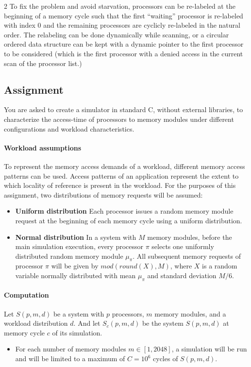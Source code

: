 \documentclass[12pt]{article}
\begin{document}
\begin{multicols}{2}
To fix the problem and avoid starvation, processors can be re-labeled at the beginning of a memory cycle such that the first ``waiting'' processor is re-labeled with index 0 and the remaining processors are cyclicly re-labeled in the natural order. The relabeling can be done dynamically while scanning, or a circular ordered data structure can be kept with a dynamic pointer to the first processor to be considered (which is the first processor with a denied access in the current scan of the processor list.)    


\subsection*{Assignment}

 You are asked to create a simulator in standard C, without external libraries, to characterize the access-time of processors to memory modules under different configurations and workload characteristics.

  \paragraph{Workload assumptions}
  To represent the memory access demands of a workload, different memory access patterns can be used. Access patterns of an application represent the extent to which locality of reference is present in the workload. For the purposes of this assignment, two distributions of memory requests will be assumed:
  \begin{itemize}
  \item \textbf{Uniform distribution} Each processor issues a random memory module request at the beginning of each memory cycle using a uniform distribution.
  \item \textbf{Normal distribution} In a system with $M$ memory modules, before the main simulation execution, every processor $\pi$ selects one uniformly distributed random memory module $\mu_{\pi}$.
    All subsequent memory requests of processor $\pi$ will be given by $mod(round(X),M)$, where $X$ is a random variable normally distributed with mean $\mu_{\pi}$ and standard deviation $M/6$.
  \end{itemize}



  \paragraph{Computation} Let $S(p,m,d)$ be a system with $p$ processors, $m$ memory modules, and a workload distribution $d$. And let $S_c(p,m,d)$ be the system $S(p,m,d)$ at memory cycle $c$ of its simulation.
  \begin{itemize}
  \item For each number of memory modules $m \in [1,2048]$, a simulation will be run and will be limited to a maximum of $C=10^6$ cycles of $S(p,m,d)$.
 

\end{itemize}
\end{multicols}
\end{document}
